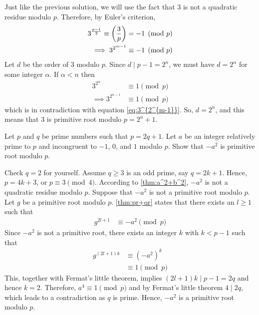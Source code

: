 \documentclass{subfile}
\begin{document}
	\begin{solution}[2]
		Just like the previous solution, we will use the fact that $3$ is not a quadratic residue modulo $p$. Therefore, by Euler's criterion,
			\begin{align}\label{eq:3^{2^{m-1}}}
				3^{\frac{p-1}{2}} \equiv  \left( \frac{3}{p} \right)
					& = -1\pmod p\\
				\implies 3^{2^{m-1}}
					& \equiv -1 \pmod p
			\end{align}
		Let $d$ be the order of $3$ modulo $p$. Since $d\mid p-1=2^n$, we must have $d=2^{\alpha}$ for some integer $\alpha$. If $\alpha<n$ then
			\begin{align*}
				3^{2^{\alpha}}
					& \equiv 1\pmod{p}\\
				\implies 3^{2^{n-1}}
					& \equiv 1\pmod{p}
			\end{align*}
		which is in contradiction with equation \eqref{eq:3^{2^{m-1}}}. So, $d=2^n$, and this means that $3$ is primitive root modulo $p=2^n+1$.
	\end{solution}

	\begin{problem}
		Let $p$ and $q$ be prime numbers such that $ p=2q+1$. Let $a$ be an integer relatively prime to $p$ and incongruent to $-1$, $0$, and $1$ modulo $p$. Show that $ -a^2$ is primitive root modulo $p$.
	\end{problem}

	\begin{solution}
		Check $ q=2$ for yourself. Assume $ q \ge 3$ is an odd prime, say $q=2k+1$. Hence, $ p=4k+3$, or $p \equiv 3 \pmod 4$. According to \autoref{thm:a^2+b^2}, $ -a^2$ is not a quadratic residue modulo $ p$. Suppose that $ -a^2$ is not a primitive root modulo $p$. Let $ g$ be a primitive root modulo $p$. \autoref{thm:pr+qr} states that there exists an $ l\ge 1$ such that
			\begin{align*}
				g^{2l+1}
					& \equiv -a^2 \pmod p
			\end{align*}
		Since $-a^2$ is not a primitive root, there exists an integer $k$ with $ k<p-1$ such that
			\begin{align*}
				g^{(2l+1)k}
					& \equiv (-a^2)^k\\
					& \equiv 1 \pmod p
			\end{align*}
		This, together with Fermat's little theorem, implies $ (2l+1)k \mid p-1=2q$ and hence $ k=2$. Therefore, $ a^4 \equiv 1 \pmod p$ and by Fermat's little theorem $ 4\mid 2q$, which leads to a contradiction as $q$ is prime. Hence, $ -a^2$ is a primitive root modulo $p$.
	\end{solution}
\end{document}
